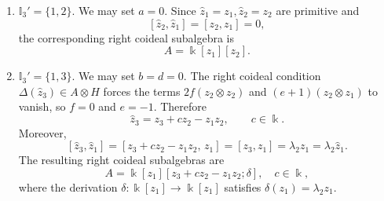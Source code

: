 \documentclass{article}
\theoremstyle{plain}
\theoremstyle{definition}
\numberwithin{equation}{section}
\newcommand{\II}{\mathbb{I}}
\begin{document}
	\begin{enumerate}
		\item $\II_{3}'=\{1,2\}$. We may set $a=0$. Since $\hat z_{1} =z_{1},\hat z_{2}=z_{2}$ are primitive and
		\[
		[\hat z_{2},\hat z_{1}]=[z_{2}, z_{1}]=0,
		\]
		the corresponding right coideal subalgebra is
		\[
		A= \Bbbk[z_{1}][z_{2}].
		\]
		
		\item $\II_{3}'=\{1,3\}$. We may set $b=d=0$. The right coideal condition $\Delta(\hat z_{3})\in A\otimes H$ forces the terms $2f(z_{2}\otimes z_{2})$ and $(e+1)(z_{2}\otimes z_{1})$ to vanish, so $f=0$ and $e=-1$. Therefore
		\[
		\hat z_{3} = z_{3}  + cz_{2}  - z_{1}z_{2},\qquad c\in\Bbbk.
		\]
		Moreover,
		\[
		[\hat z_{3},\hat z_{1}] = [z_{3}  + cz_{2} - z_{1}z_{2},\,z_{1}]
		= [z_{3},z_{1}] = \lambda_{2} z_{1} =\lambda_{2} \hat z_{1}.
		\]
		The resulting right coideal subalgebras are
		\[
		A =\Bbbk[z_{1}][z_{3}+cz_{2}-z_{1}z_{2};\delta], \quad c\in \Bbbk,
		\]
		where the derivation $\delta\colon \Bbbk[z_{1}] \to \Bbbk[z_{1}]$ satisfies $\delta(z_{1})=\lambda_{2} z_{1}$.
		

\end{enumerate}
\end{document}
